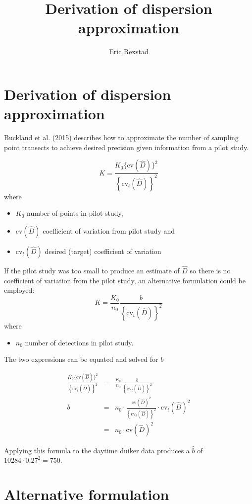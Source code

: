 \documentclass[10pt,a4paper]{article}
\author{Eric Rexstad}
\title{Derivation of dispersion approximation}
\begin{document}
\section{Derivation of dispersion approximation}
Buckland et al. (2015) describes how to approximate the number of sampling point transects to achieve desired precision given information from a pilot study.

\begin{equation}
\label{eq:21}
K=\frac{K_{0}\{\mbox{cv}(\hat{D})\}^{2}}{\left\{\mbox{cv}_{t}(\hat{D})\right\}^{2}}
\end{equation}
where
\begin{itemize}
	\item $K_0$ number of points in pilot study, 
	\item $\mbox{cv}(\hat{D})$ coefficient of variation from pilot study and
	\item $\mbox{cv}_{t}(\hat{D})$ desired (target) coefficient of variation
\end{itemize}

If the pilot study was too small to produce an estimate of $\hat{D}$ so there is no coefficient of variation from the pilot study, an alternative formulation could be employed:
\begin{equation}
\label{eq:22}
K=\frac{K_{0}}{n_{0}} \frac{b}{\left\{\mathrm{cv}_{t}(\hat{D})\right\}^{2}}
\end{equation}
where
\begin{itemize}
	\item $n_0$ number of detections in pilot study.
\end{itemize}

The two expressions can be equated and solved for $b$

\begin{eqnarray}
\label{eq:last}
\frac{K_{0}\{\mbox{cv}(\hat{D})\}^2}{\left\{\mbox{cv}_t(\hat{D})\right\}^2} &=& \frac{K_{0}}{n_0} \frac{b}{\left\{\mathrm{cv}_t(\hat{D})\right\}^2} \\ \nonumber
b &=& {n_0} \cdot \frac{\mbox{cv}(\hat{D})^2}{\left\{\mbox{cv}_t(\hat{D})\right\}^2}\cdot \mbox{cv}_t(\hat{D})^2  \\ 
&=& {n_0} \cdot \mbox{cv}(\hat{D})^2 \nonumber
\end{eqnarray}

Applying this formula to the daytime duiker data produces a $\hat{b}$ of $10284 \cdot 0.27^2 = 750$.

\section{Alternative formulation}
\end{document}
